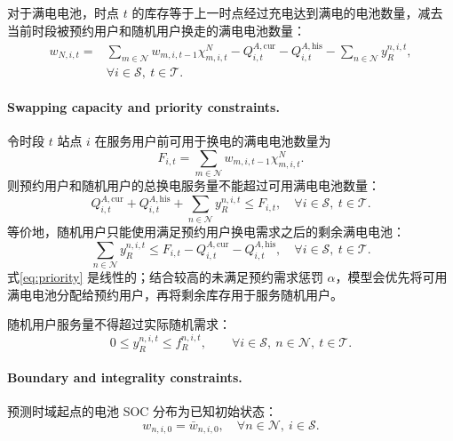 \documentclass[12pt,hyperref,a4paper,UTF8]{ctexart}
\begin{document}
对于满电电池，时点 $t$ 的库存等于上一时点经过充电达到满电的电池数量，减去当前时段被预约用户和随机用户换走的满电电池数量：
\begin{equation}
\begin{aligned}
w_{N,i,t}
=&
\sum_{m\in \mathcal{N}}
w_{m,i,t-1}\chi_{m,i,t}^{N}
-
Q_{i,t}^{A,\mathrm{cur}}
-
Q_{i,t}^{A,\mathrm{his}}
-
\sum_{n\in \mathcal{N}}y_R^{n,i,t},
\\
&\forall i\in \mathcal{S},\ t\in \mathcal{T}.
\end{aligned}
\label{eq:transition_full}
\end{equation}

\paragraph{Swapping capacity and priority constraints.}
令时段 $t$ 站点 $i$ 在服务用户前可用于换电的满电电池数量为
\begin{equation}
F_{i,t}=\sum_{m\in\mathcal{N}}w_{m,i,t-1}\chi_{m,i,t}^{N}.
\label{eq:available_full_batteries}
\end{equation}
则预约用户和随机用户的总换电服务量不能超过可用满电电池数量：
\begin{equation}
Q_{i,t}^{A,\mathrm{cur}}+Q_{i,t}^{A,\mathrm{his}}+
\sum_{n\in\mathcal{N}}y_R^{n,i,t}
\le F_{i,t},
\quad \forall i\in\mathcal{S},\ t\in\mathcal{T}.
\label{eq:full_battery_capacity}
\end{equation}
等价地，随机用户只能使用满足预约用户换电需求之后的剩余满电电池：
\begin{equation}
\sum_{n\in\mathcal{N}}y_R^{n,i,t}
\le F_{i,t}-Q_{i,t}^{A,\mathrm{cur}}-Q_{i,t}^{A,\mathrm{his}},
\quad \forall i\in\mathcal{S},\ t\in\mathcal{T}.
\label{eq:priority}
\end{equation}
式\eqref{eq:priority} 是线性的；结合较高的未满足预约需求惩罚 $\alpha$，模型会优先将可用满电电池分配给预约用户，再将剩余库存用于服务随机用户。

随机用户服务量不得超过实际随机需求：
\begin{equation}
0\le y_R^{n,i,t}\le f_R^{n,i,t},
\qquad
\forall i\in \mathcal{S},\ n\in \mathcal{N},\ t\in \mathcal{T}.
\label{eq:random_bound}
\end{equation}

\paragraph{Boundary and integrality constraints.}
预测时域起点的电池 SOC 分布为已知初始状态：
\begin{equation}
w_{n,i,0}=\bar{w}_{n,i,0},
\quad \forall n\in \mathcal{N},\ i\in \mathcal{S}.
\label{eq:initial_inventory}
\end{equation}
\end{document}
